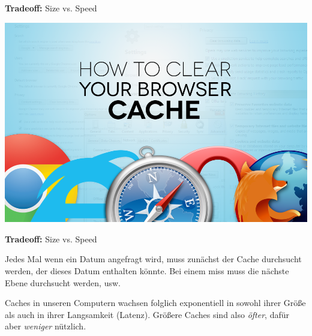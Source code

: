 \documentclass{beamer}
\begin{document}
\begin{frame}

\textbf{Tradeoff:} Size vs. Speed
\bigskip

\begin{center}
\includegraphics[scale=0.25]{browsercache.png} 
\end{center}

\end{frame}


\begin{frame}

\textbf{Tradeoff:} Size vs. Speed
\bigskip

Jedes Mal wenn ein Datum angefragt wird, muss zunächst der Cache durchsucht werden, der dieses Datum enthalten könnte. Bei einem miss muss die nächste Ebene durchsucht werden, usw.
\pause
\bigskip

Caches in unseren Computern wachsen folglich exponentiell in sowohl ihrer Größe als auch in ihrer Langsamkeit (Latenz). Größere Caches sind also \emph{öfter}, dafür aber \emph{weniger} nützlich.

\end{frame}

\end{document}
